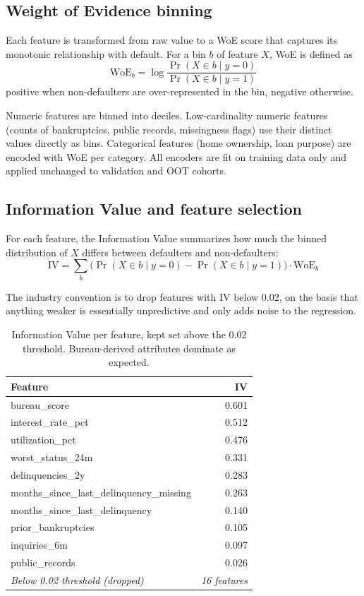 \documentclass[a4paper,11pt]{article}
\begin{document}
\subsection{Weight of Evidence binning}

Each feature is transformed from raw value to a WoE score that
captures its monotonic relationship with default. For a bin $b$ of
feature $X$, WoE is defined as
$$\mathrm{WoE}_b = \log\!\frac{\Pr(X \in b \mid y = 0)}{\Pr(X \in b \mid y = 1)}$$
positive when non-defaulters are over-represented in the bin, negative
otherwise.

Numeric features are binned into deciles. Low-cardinality numeric
features (counts of bankruptcies, public records, missingness flags)
use their distinct values directly as bins. Categorical features
(home ownership, loan purpose) are encoded with WoE per category.
All encoders are fit on training data only and applied unchanged to
validation and OOT cohorts.

\subsection{Information Value and feature selection}

For each feature, the Information Value summarizes how much the
binned distribution of $X$ differs between defaulters and
non-defaulters:
$$\mathrm{IV} = \sum_b \big( \Pr(X \in b \mid y = 0) - \Pr(X \in b \mid y = 1) \big) \cdot \mathrm{WoE}_b$$

The industry convention is to drop features with IV below 0.02, on
the basis that anything weaker is essentially unpredictive and only
adds noise to the regression.

\begin{table}[H]
\centering
\begin{tabular}{l r}
\toprule
\textbf{Feature} & \textbf{IV} \\
\midrule
bureau\_score                          & 0.601 \\
interest\_rate\_pct                    & 0.512 \\
utilization\_pct                       & 0.476 \\
worst\_status\_24m                     & 0.331 \\
delinquencies\_2y                      & 0.283 \\
months\_since\_last\_delinquency\_missing & 0.263 \\
months\_since\_last\_delinquency       & 0.140 \\
prior\_bankruptcies                    & 0.105 \\
inquiries\_6m                          & 0.097 \\
public\_records                        & 0.026 \\
\midrule
\textit{Below 0.02 threshold (dropped)} & \textit{16 features} \\
\bottomrule
\end{tabular}
\caption{Information Value per feature, kept set above the 0.02 threshold. Bureau-derived attributes dominate as expected.}
\end{table}
\end{document}
